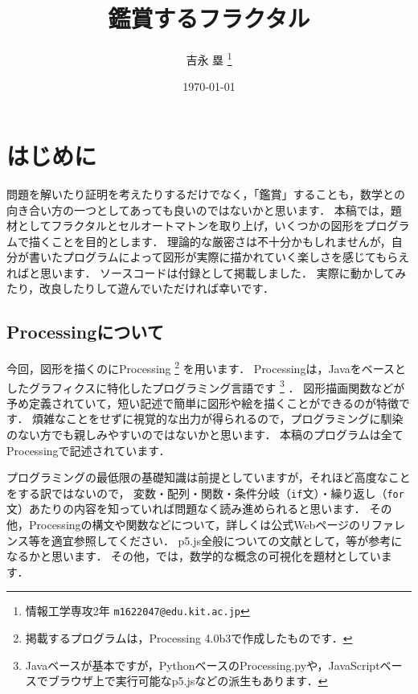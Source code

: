 \documentclass[dvipdfmx]{jsarticle}
\title{鑑賞するフラクタル}
\author{吉永 塁 \thanks{情報工学専攻2年 \texttt{m1622047@edu.kit.ac.jp}}}
\date{\today}
\theoremstyle{definition}
\begin{document}
\maketitle


\section{はじめに}  \label{sec_introduction}
問題を解いたり証明を考えたりするだけでなく，「鑑賞」することも，数学との向き合い方の一つとしてあっても良いのではないかと思います．
本稿では，題材としてフラクタルとセルオートマトンを取り上げ，いくつかの図形をプログラムで描くことを目的とします．
理論的な厳密さは不十分かもしれませんが，自分が書いたプログラムによって図形が実際に描かれていく楽しさを感じてもらえればと思います．
ソースコードは付録として掲載しました．
実際に動かしてみたり，改良したりして遊んでいただければ幸いです．

\subsection{Processingについて}  \label{subsec_processing}
今回，図形を描くのにProcessing\cite{pcweb}
\footnote{
    掲載するプログラムは，Processing 4.0b3で作成したものです．
}
を用います．
Processingは，Javaをベースとしたグラフィクスに特化したプログラミング言語です
\footnote{
    Javaベースが基本ですが，PythonベースのProcessing.py\cite{pcpy}や，JavaScriptベースでブラウザ上で実行可能なp5.js\cite{p5js}などの派生もあります．
}
．
図形描画関数などが予め定義されていて，短い記述で簡単に図形や絵を描くことができるのが特徴です．
煩雑なことをせずに視覚的な出力が得られるので，プログラミングに馴染のない方でも親しみやすいのではないかと思います．
本稿のプログラムは全てProcessingで記述されています．

プログラミングの最低限の基礎知識は前提としていますが，それほど高度なことをする訳ではないので，
変数・配列・関数・条件分岐（\texttt{if}文）・繰り返し（\texttt{for}文）あたりの内容を知っていれば問題なく読み進められると思います．
その他，Processingの構文や関数などについて，詳しくは公式Webページのリファレンス等を適宜参照してください．
p5.js全般についての文献として，\cite{genart,cgmediaart}等が参考になるかと思います．
その他，\cite{mathgen}では，数学的な概念の可視化を題材としています．
\end{document}

